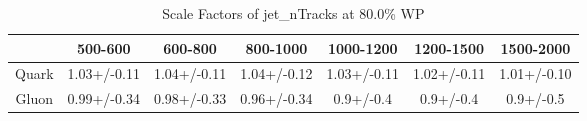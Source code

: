 \begin{table}
\centering
\caption{Scale Factors of jet_nTracks at 80.0\% WP}
\label{tab:jet_nTracks_0.8_Gluon}
\begin{tabular}{ccccccc}
\toprule
{} &      500-600 &      600-800 &     800-1000 &    1000-1200 &    1200-1500 &    1500-2000 \\
\midrule
Quark &  1.03+/-0.11 &  1.04+/-0.11 &  1.04+/-0.12 &  1.03+/-0.11 &  1.02+/-0.11 &  1.01+/-0.10 \\
Gluon &  0.99+/-0.34 &  0.98+/-0.33 &  0.96+/-0.34 &    0.9+/-0.4 &    0.9+/-0.4 &    0.9+/-0.5 \\
\bottomrule
\end{tabular}
\end{table}
